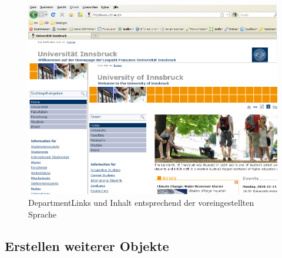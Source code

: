 \begin{figure}[!ht]
	\centering
		\includegraphics[width=\textwidth]{./images/departmentlinkszweisprachig.png}
	\caption{DepartmentLinks und Inhalt entsprechend der voreingestellten Sprache}
	\label{fig:deplinkszweisprachig}
\end{figure}

\subsection{Erstellen weiterer Objekte}
\label{weitereobjekte}

